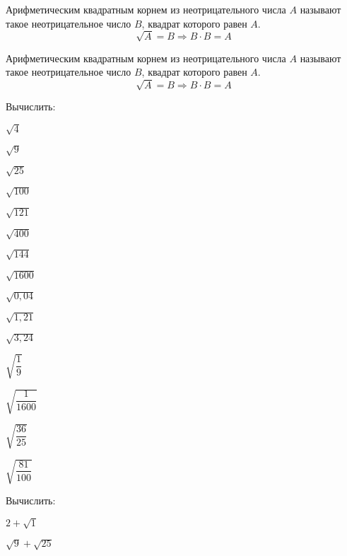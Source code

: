 %
%
%
%
\begin{class}[number=1]
	\begin{definit}
		Арифметическим квадратным корнем из неотрицательного числа \( A \) называют такое неотрицательное число \( B \), квадрат которого равен \( A \).
		\[ \sqrt{A}=B \Rightarrow B\cdot B = A \]
	\end{definit}
	\begin{definit}
		Арифметическим квадратным корнем из неотрицательного числа \( A \) называют такое неотрицательное число \( B \), квадрат которого равен \( A \).
		\[ \sqrt{A}=B \Rightarrow B\cdot B = A \]
	\end{definit}
	\begin{listofex}
		\item Вычислить:
		\begin{enumcols}[itemcolumns=6]
			\item \( \sqrt{4} \)
			\item \( \sqrt{9} \)
			\item \( \sqrt{25} \)
			\item \( \sqrt{100} \)
			\item \( \sqrt{121} \)
			\item \( \sqrt{400} \)
			\item \( \sqrt{144} \)
			\item \( \sqrt{1600} \)
			\item \( \sqrt{0,04} \)
			\item \( \sqrt{1,21} \)
			\item \( \sqrt{3,24} \)
			\item \( \sqrt{\dfrac{1}{9}} \)
			\item \( \sqrt{\dfrac{1}{1600}} \)
			\item \( \sqrt{\dfrac{36}{25}} \)
			\item \( \sqrt{\dfrac{81}{100}} \)
		\end{enumcols}
		\item Вычислить:
		\begin{enumcols}[itemcolumns=4]
			\item \( 2+\sqrt{1} \)
			\item \( \sqrt{9}+\sqrt{25} \)

\end{enumcols}
\end{listofex}
\end{class}
